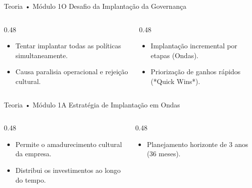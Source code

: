 \begin{senaiframe}{Teoria • Módulo 1}{O Desafio da Implantação da Governança}
  \begin{columns}[t]
    \begin{column}{0.48\textwidth}
      \begin{tcolorbox}[senairedcard, title={Erro da "Big Bang"}]
        \begin{itemize}
          \item Tentar implantar todas as políticas simultaneamente.
          \item Causa paralisia operacional e rejeição cultural.
        \end{itemize}
      \end{tcolorbox}
    \end{column}
    \begin{column}{0.48\textwidth}
      \begin{tcolorbox}[senaigreencard, title={Abordagem Gradual}]
        \begin{itemize}
          \item Implantação incremental por etapas (Ondas).
          \item Priorização de ganhos rápidos (*Quick Wins*).
        \end{itemize}
      \end{tcolorbox}
    \end{column}
  \end{columns}
\end{senaiframe}

\begin{senaiframe}{Teoria • Módulo 1}{A Estratégia de Implantação em Ondas}
  \begin{columns}[t]
    \begin{column}{0.48\textwidth}
      \begin{tcolorbox}[senaibluecard, title={Por que usar Ondas?}]
        \begin{itemize}
          \item Permite o amadurecimento cultural da empresa.
          \item Distribui os investimentos ao longo do tempo.
        \end{itemize}
      \end{tcolorbox}
    \end{column}
    \begin{column}{0.48\textwidth}
      \begin{tcolorbox}[senaicard, title={Visão de Longo Prazo}]
        \begin{itemize}
          \item Planejamento horizonte de 3 anos (36 meses).
        \end{itemize}
      \end{tcolorbox}
    \end{column}
  \end{columns}
\end{senaiframe}

